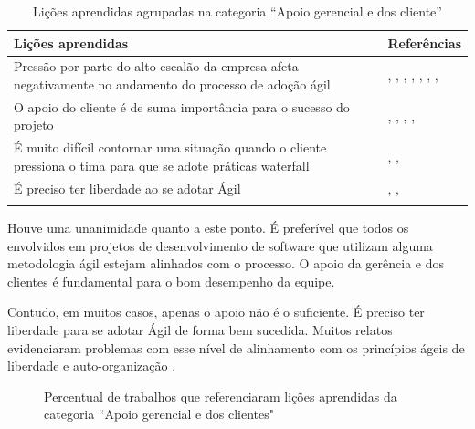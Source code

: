 \begin{table}[H]
	\centering
	\captionsetup{justification=centering}
	\begin{tabularx}{\linewidth}{ | X | p{5cm} | } \hline \textbf{Lições aprendidas} & \textbf{Referências} \\ \hline
		Pressão por parte do alto escalão da empresa afeta negativamente no andamento do processo de adoção ágil & \cite{Hajjdiab2011}, \cite{Cisco2011}, \cite{Claudia2013}, \cite{Parzinello2012}, \cite{Stefano2013}, \cite{Bastos2013}, \cite{Maciel2013}, \cite{Srinath2012} \\ \hline
		O apoio do cliente é de suma importância para o sucesso do projeto & \cite{Arikpo2011}, \cite{Claudia2013}, \cite{Parzinello2012}, \cite{Stefano2013}, \cite{Maciel2013} \\ \hline
		É muito difícil contornar uma situação quando o cliente pressiona o tima para que se adote práticas waterfall & \cite{Claudia2013}, \cite{Piegas2012}, \cite{Srinath2012} \\ \hline
		É preciso ter liberdade ao se adotar Ágil & \cite{Piegas2012}, \cite{Stefano2013}, \cite{Maciel2013} \\ \hline
	\caption{Lições aprendidas agrupadas na categoria ``Apoio gerencial e dos cliente''}
	\end{tabularx}
\end{table}

Houve uma unanimidade quanto a este ponto. É preferível que todos os envolvidos em projetos de desenvolvimento de software que utilizam alguma metodologia ágil estejam alinhados com o processo. O apoio da gerência e dos clientes é fundamental para o bom desempenho da equipe.

Contudo, em muitos casos, apenas o apoio não é o suficiente. É preciso ter liberdade para se adotar Ágil de forma bem sucedida. Muitos relatos evidenciaram problemas com esse nível de alinhamento com os princípios ágeis de liberdade e auto-organização \cite{Piegas2012,Stefano2013,Maciel2013}.

\begin{figure}[H]
	\centering
	\captionsetup{justification=centering}
	\caption{Percentual de trabalhos que referenciaram lições aprendidas da categoria ``Apoio gerencial e dos clientes"}
	\label{fig:apoio}
\end{figure}

